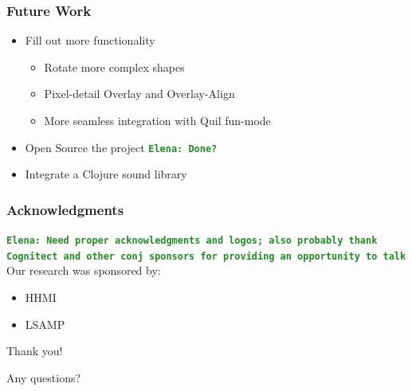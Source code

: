 \documentclass{beamer}
\newcommand{\comment}[1]{{\bf \tt  {#1}}}
\newcommand{\emcomment}[1]{\textcolor{ForestGreen}{\comment{Elena: {#1}}}}
\begin{document}
\begin{frame}
	\frametitle{Future Work}
	\begin{itemize}
		\item Fill out more functionality
		\begin{itemize}
			\item Rotate more complex shapes
			\item Pixel-detail Overlay and Overlay-Align
			\item More seamless integration with Quil fun-mode
		\end{itemize}
		\item Open Source the project \emcomment{Done?}
		\item Integrate a Clojure sound library
	\end{itemize}
\end{frame}

\begin{frame}
\frametitle{Acknowledgments}
\emcomment{Need proper acknowledgments and logos; also probably thank Cognitect and other conj sponsors for providing an opportunity to talk}
	Our research was sponsored by:
	\begin{itemize}
	\item HHMI
	\item LSAMP
	\end{itemize}
	{\centering
	\noindent
	Thank you! \par
	Any questions? \par
	}
\end{frame}
\end{document}
